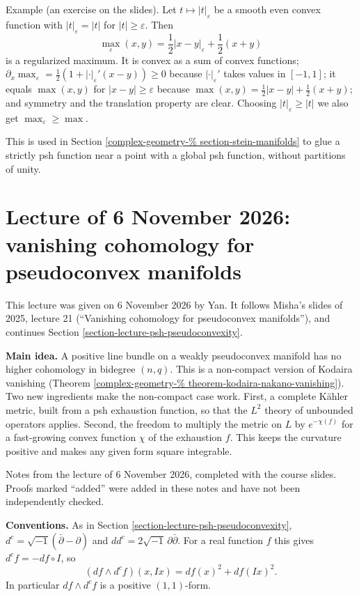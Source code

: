 \noindent
Example (an exercise on the slides). Let
$t\mapsto|t|_\varepsilon$ be a smooth even
convex function with $|t|_\varepsilon=|t|$
for $|t|\geq\varepsilon$. Then
$$
\max_\varepsilon(x,y)
=\frac{1}{2}|x-y|_\varepsilon+\frac{1}{2}(x
+y)
$$
is a regularized maximum. It is convex as a
sum of convex functions;
$\partial_x\max_\varepsilon=\frac12(1
+|\cdot|_\varepsilon'(x-y))\geq0$
because $|\cdot|_\varepsilon'$ takes values
in $[-1,1]$; it equals $\max(x,y)$ for
$|x-y|\geq\varepsilon$ because
$\max(x,y)=\frac12|x-y|+\frac12(x+y)$; and
symmetry and the translation property are
clear. Choosing $|t|_\varepsilon\geq|t|$ we
also get $\max_\varepsilon\geq\max$.

\noindent
This is used in Section
\ref{complex-geometry-%
section-stein-manifolds}
to glue a strictly psh function near a point
with a global psh function, without
partitions of unity.


\section{Lecture of 6 November 2026:
vanishing cohomology for pseudoconvex
manifolds}
\label{section-vanishing-pseudoconvex}

\noindent
This lecture was given on 6 November 2026 by
Yan. It follows Misha's slides of 2025,
lecture 21 (``Vanishing cohomology for
pseudoconvex manifolds''), and continues
Section
\ref{section-lecture-psh-pseudoconvexity}.

\medskip\noindent
{\bf Main idea.} A positive line bundle on a
weakly pseudoconvex manifold has no higher
cohomology in bidegree $(n,q)$. This is a
non-compact version of Kodaira vanishing
(Theorem
\ref{complex-geometry-%
theorem-kodaira-nakano-vanishing}).
Two new ingredients make the non-compact case
work. First, a complete K\"ahler metric,
built from a psh exhaustion function, so that
the $L^2$ theory of unbounded operators
applies. Second, the freedom to multiply the
metric on $L$ by $e^{-\chi(f)}$ for a
fast-growing convex function $\chi$ of the
exhaustion $f$. This keeps the curvature
positive and makes any given form square
integrable.

\medskip\noindent
Notes from the lecture of 6 November 2026,
completed with the course slides.
Proofs marked ``added'' were added in these
notes and have not been independently
checked.

\medskip\noindent
{\bf Conventions.} As in Section
\ref{section-lecture-psh-pseudoconvexity},
$d^c=\sqrt{-1}(\bar\partial-\partial)$ and
$dd^c=2\sqrt{-1}\,\partial\bar\partial$. For
a real function $f$ this gives $d^cf=-df\circ
I$, so
$$
(df\wedge d^cf)(x,Ix)=df(x)^2+df(Ix)^2 .
$$
In particular $df\wedge d^cf$ is a positive
$(1,1)$-form.

